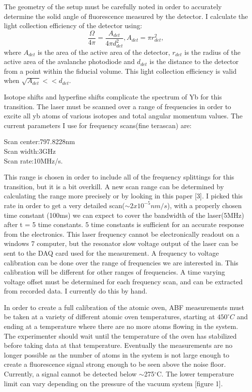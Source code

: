 \documentclass[12pt, a4paper]{article}
\begin{document}
The geometry of the setup must be carefully noted in order to accurately determine the solid angle of fluorescence measured by the detector. I calculate the light collection efficiency of the detector using:
\begin{equation}
\frac{\Omega}{4\pi} = \frac{A_{det}}{4\pi d_{det}^2},
A_{det} = \pi r_{det}^2,
\end{equation}
where $A_{det}$ is the area of the active area of the detector, $r_{det}$ is the radius of the active area of the avalanche photodiode and $d_{det}$ is the distance to the detector from a point within the fiducial volume. This light collection efficiency is valid when $\sqrt{A_{det}} << d_{det}$.

Isotope shifts and hyperfine shifts complicate the spectrum of Yb for this transition. The laser must be scanned over a range of frequencies in order to excite all yb atoms of various isotopes and total angular momentum values. The current parameters I use for frequency scans(fine terascan) are:
\begin{center}
Scan center:797.8228nm\\
Scan width:3GHz\\
Scan rate:10MHz/s.\\
\end{center}
This range is chosen in order to include all of the frequency splittings for this transition, but it is a bit overkill.  A new scan range can be determined by calculating the range more precisely or by looking in this paper [3]. I picked this rate in order to get a very detailed scan($\sim 2x10^{-5}nm/s$), with a properly chosen time constant (100ms) we can expect to cover the bandwidth of the laser(5MHz) after t = 5 time constants. 5 time constants is sufficient for an accurate response from the electronics. This laser frequency cannot be electronically readout on a windows 7 computer, but the resonator slow voltage output of the laser can be sent to the DAQ card used for the measurement. A frequency to voltage calibration can be done over the range of frequencies we are interested in. This calibration will be different for other ranges of frequencies. A time varying voltage offset must be determined for each frequency scan, and can be extracted from recorded data. I currently do this by hand.

In order to create a full calibration of the atomic oven, ABF measurements must be taken at a variety of different atomic oven temperatures, starting at $450^{\circ}C$ and ending at a temperature where there are no more atoms flowing in the system. The experimenter should wait until the temperature of the oven has stabilized before taking data at that temperature. Eventually the measurements are no longer possible as the number of atoms in the system is not large enough to create a fluorescence signal strong enough to be seen above the noise floor. Currently, a signal cannot be detected below $\sim$275$^{\circ}$C. The lower temperature limit can vary depending on the pressure of the vacuum system [figure 1].
\end{document}
